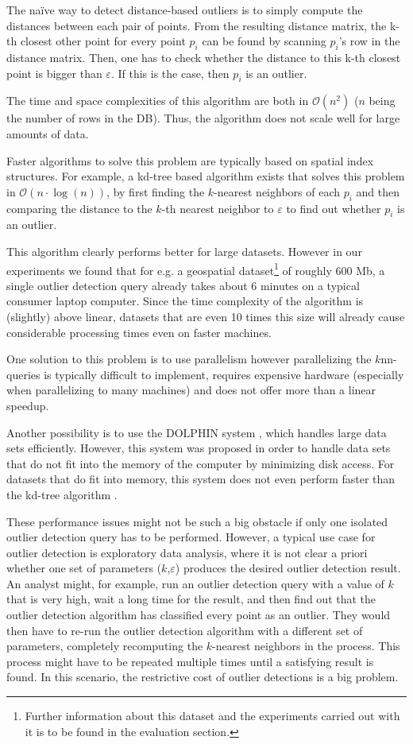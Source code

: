 \documentclass[runningheads]{llncs}
\begin{document}
The na{\"i}ve way to detect distance-based outliers is to simply compute the distances between each pair of points. From the resulting distance matrix, the k-th closest other point for every point $p_i$ can be found by scanning $p_i$'s row in the distance matrix. Then, one has to check whether the distance to this k-th closest point is bigger than $\varepsilon$. If this is the case, then $p_i$ is an outlier.

The time and space complexities of this algorithm are both in $\mathcal{O}(n^2)$ ($n$ being the number of rows in the DB). Thus, the algorithm does not scale well for large amounts of data.

Faster algorithms to solve this problem are typically based on spatial index structures. For example, a kd-tree based algorithm exists that solves this problem in $\mathcal{O}(n \cdot\log(n))$, by first finding the $k$-nearest neighbors of each $p_i$ and then comparing the distance to the $k$-th nearest neighbor to $\varepsilon$ to find out whether $p_i$ is an outlier. 

This algorithm clearly performs better for large datasets. However in our experiments we found that for e.g. a geospatial dataset\footnote{Further information about this dataset and the experiments carried out with it is to be found in the evaluation section.} of roughly 600 Mb, a single outlier detection query already takes about 6 minutes on a typical consumer laptop computer. Since the time complexity of the algorithm is (slightly) above linear, datasets that are even 10 times this size will already cause considerable processing times even on faster machines.

One solution to this problem is to use parallelism \cite{parallel_knn}
however parallelizing the $k$nn-queries is typically difficult to implement, requires expensive hardware (especially when parallelizing to many machines) and does not offer more than a linear speedup.

Another possibility is to use the DOLPHIN system \cite{dolphin}, which handles large data sets efficiently. However, this system was proposed in order to handle data sets that do not fit into the memory of the computer by minimizing disk access. For datasets that do fit into memory, this system does not even perform faster than the kd-tree algorithm \cite{onion}.

These performance issues might not be such a big obstacle if only one isolated outlier detection query has to be performed. However, a typical use case for outlier detection is exploratory data analysis, where it is not clear a priori whether one set of parameters ($k$,$\varepsilon$) produces the desired outlier detection result. An analyst might, for example, run an outlier detection query with a value of $k$ that is very high, wait a long time for the result, and then find out that the outlier detection algorithm has classified every point as an outlier. They would then have to re-run the outlier detection algorithm with a different set of parameters, completely recomputing the $k$-nearest neighbors in the process. This process might have to be repeated multiple times until a satisfying result is found. In this scenario, the restrictive cost of outlier detections is a big problem.
\end{document}
